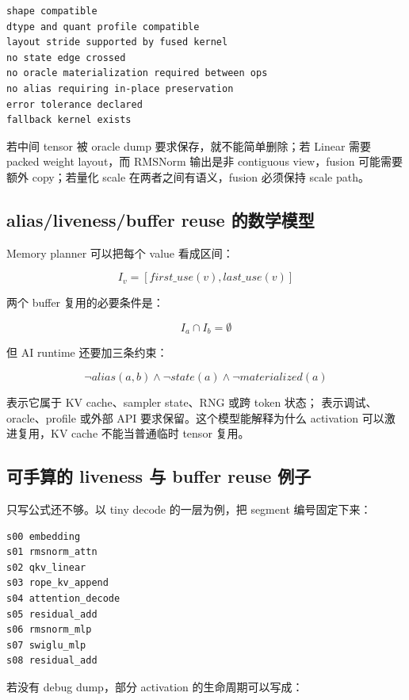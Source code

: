 \begin{lstlisting}[numbers=none,caption={Fusion legality checklist}]
shape compatible
dtype and quant profile compatible
layout stride supported by fused kernel
no state edge crossed
no oracle materialization required between ops
no alias requiring in-place preservation
error tolerance declared
fallback kernel exists
\end{lstlisting}

若中间 tensor 被 oracle dump 要求保存，就不能简单删除；若 Linear 需要 packed weight layout，而 RMSNorm 输出是非 contiguous view，fusion 可能需要额外 copy；若量化 scale 在两者之间有语义，fusion 必须保持 scale path。

\subsection{alias/liveness/buffer reuse 的数学模型}

Memory planner 可以把每个 value 看成区间：

\[
I_v = [first\_use(v), last\_use(v)]
\]

两个 buffer 复用的必要条件是：

\[
I_a \cap I_b = \emptyset
\]

但 AI runtime 还要加三条约束：

\[
\neg alias(a,b) \land \neg state(a) \land \neg materialized(a)
\]

 表示它属于 KV cache、sampler state、RNG 或跨 token 状态； 表示调试、oracle、profile 或外部 API 要求保留。这个模型能解释为什么 activation 可以激进复用，KV cache 不能当普通临时 tensor 复用。

\subsection{可手算的 liveness 与 buffer reuse 例子}

只写公式还不够。以 tiny decode 的一层为例，把 segment 编号固定下来：

\begin{lstlisting}[numbers=none,caption={tiny decode segment 顺序}]
s00 embedding
s01 rmsnorm_attn
s02 qkv_linear
s03 rope_kv_append
s04 attention_decode
s05 residual_add
s06 rmsnorm_mlp
s07 swiglu_mlp
s08 residual_add
\end{lstlisting}

若没有 debug dump，部分 activation 的生命周期可以写成：

